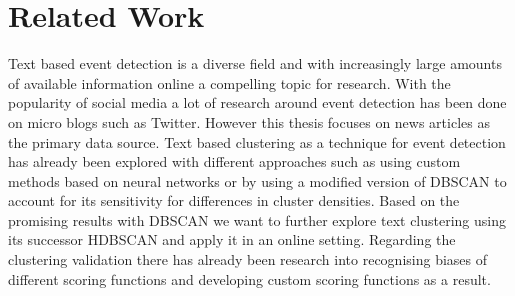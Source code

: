 \section{Related Work}

Text based event detection is a diverse field and with increasingly large amounts of available information online a compelling topic for research.
With the popularity of social media a lot of research around event detection has been done on micro blogs\cite{microblog_clustering} such as Twitter\cite{twitter_survey}\cite{social_media_survey}.
However this thesis focuses on news articles as the primary data source.
Text based clustering as a technique for event detection has already been explored with different approaches such as using custom methods based on neural networks\cite{text_clustering_topic_detection}
or by using a modified version of DBSCAN to account for its sensitivity for differences in cluster densities\cite{dbscan_martingale}.
Based on the promising results with DBSCAN we want to further explore text clustering using its successor HDBSCAN\cite{McInnes2017} and apply it in an online setting.
Regarding the clustering validation there has already been research into recognising biases of different scoring functions \cite{Wu:2009:ARM:1557019.1557115}
and developing custom scoring functions as a result\cite{gates2017comparing}.
